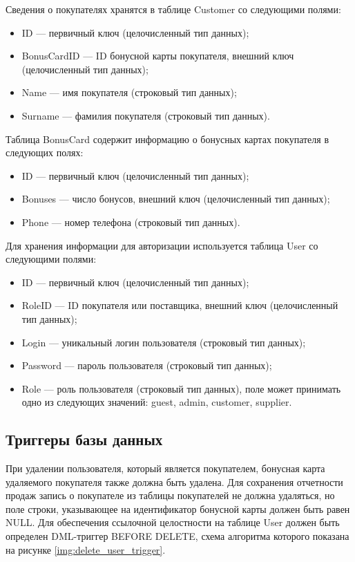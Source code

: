 Сведения о покупателях хранятся в таблице Customer со следующими полями:
\begin{itemize}
	\item ID --- первичный ключ (целочисленный тип данных);
	\item BonusCardID --- ID бонусной карты покупателя, внешний ключ (целочисленный тип данных);
	\item Name --- имя покупателя (строковый тип данных);
	\item Surname --- фамилия покупателя (строковый тип данных).
\end{itemize}

Таблица BonusCard содержит информацию о бонусных картах покупателя в следующих полях:
\begin{itemize}
	\item ID --- первичный ключ (целочисленный тип данных);
	\item Bonuses --- число бонусов, внешний ключ (целочисленный тип данных);
	\item Phone --- номер телефона (строковый тип данных).
\end{itemize}

Для хранения информации для авторизации используется таблица User со следующими полями:
\begin{itemize}
	\item ID --- первичный ключ (целочисленный тип данных);
	\item RoleID --- ID покупателя или поставщика, внешний ключ (целочисленный тип данных);
	\item Login --- уникальный логин пользователя (строковый тип данных);
	\item Password --- пароль пользователя (строковый тип данных);
	\item Role --- роль пользователя (строковый тип данных), поле может принимать одно из следующих значений: guest, admin, customer, supplier.
\end{itemize}

\subsection{Триггеры базы данных}

При удалении пользователя, который является покупателем, бонусная карта удаляемого покупателя также должна быть удалена. Для сохранения отчетности продаж запись о покупателе из таблицы покупателей не должна удаляться, но поле строки, указывающее на идентификатор бонусной карты должен быть равен NULL. Для обеспечения ссылочной целостности на таблице User должен быть определен DML-триггер BEFORE DELETE, схема алгоритма которого показана на рисунке \ref{img:delete_user_trigger}.

